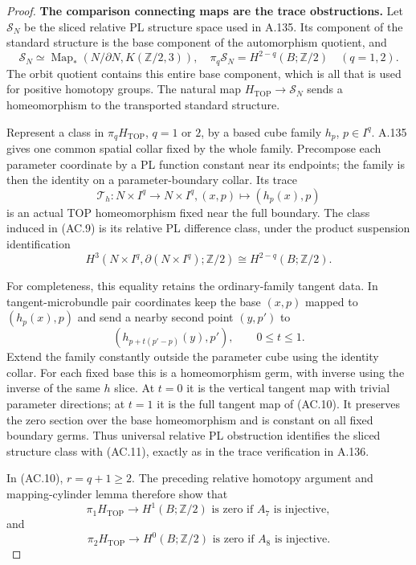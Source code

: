 \begin{proof}
\textbf{The comparison connecting maps are the trace obstructions.}
Let $\mathcal S_N$ be the sliced relative PL structure space used in
A.135. Its component of the standard structure is the base component
of the automorphism quotient, and
\[
 \mathcal S_N\simeq
 \operatorname{Map}_*(N/\partial N,K(\mathbb Z/2,3)),
 \quad \pi_q\mathcal S_N=H^{2-q}(B;\mathbb Z/2)
 \quad(q=1,2).                                                     \tag{AC.9}
\]
The orbit quotient contains this entire base component, which is all
that is used for positive homotopy groups. The natural map
$H_{\mathrm{TOP}}\to\mathcal S_N$ sends a homeomorphism to the
transported standard structure.

Represent a class in $\pi_qH_{\mathrm{TOP}}$, $q=1$ or $2$, by a based
cube family $h_p$, $p\in I^q$. A.135 gives one common spatial collar
fixed by the whole family. Precompose each parameter coordinate by
a PL function constant near its endpoints; the family is then the
identity on a parameter-boundary collar. Its trace
\[
 \mathcal T_h:N\times I^q\longrightarrow N\times I^q,
                 (x,p)\longmapsto(h_p(x),p)                        \tag{AC.10}
\]
is an actual TOP homeomorphism fixed near the full boundary. The
class induced in (AC.9) is its relative PL difference class, under
the product suspension identification
\[
 H^3(N\times I^q,\partial(N\times I^q);\mathbb Z/2)
                         \cong H^{2-q}(B;\mathbb Z/2).             \tag{AC.11}
\]

For completeness, this equality retains the ordinary-family tangent
data. In tangent-microbundle pair coordinates keep the base $(x,p)$
mapped to $(h_p(x),p)$ and send a nearby second point $(y,p')$ to
\[
                (h_{p+t(p'-p)}(y),p'),\qquad 0\le t\le1.
\]
Extend the family constantly outside the parameter cube using the
identity collar. For each fixed base this is a homeomorphism germ,
with inverse using the inverse of the same $h$ slice. At $t=0$ it
is the vertical tangent map with trivial parameter directions; at
$t=1$ it is the full tangent map of (AC.10). It preserves the zero
section over the base homeomorphism and is constant on all fixed
boundary germs. Thus universal relative PL obstruction identifies
the sliced structure class with (AC.11), exactly as in the trace
verification in A.136.

In (AC.10), $r=q+1\ge2$. The preceding relative homotopy argument and
mapping-cylinder lemma therefore show that
\[
 \pi_1H_{\mathrm{TOP}}\longrightarrow H^1(B;\mathbb Z/2)
       \text{ is zero if }A_7\text{ is injective},                 \tag{AC.12}
\]
and
\[
 \pi_2H_{\mathrm{TOP}}\longrightarrow H^0(B;\mathbb Z/2)
       \text{ is zero if }A_8\text{ is injective}.                 \tag{AC.13}
\]


\end{proof}
